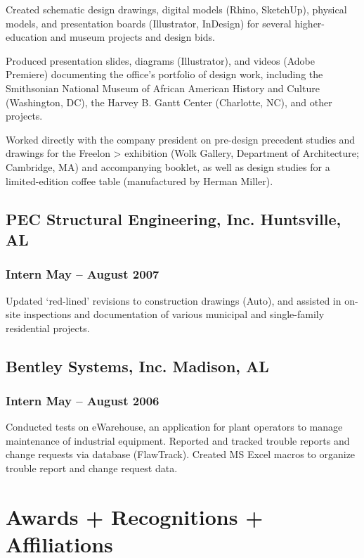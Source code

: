 \documentclass[letterpaper, oneside, 10pt]{article}
\begin{document}
Created schematic design drawings, digital models (Rhino, SketchUp), physical
models, and presentation boards (Illustrator, InDesign) for several
higher-education and museum projects and design bids.

Produced presentation slides, diagrams (Illustrator), and videos (Adobe
Premiere) documenting the office’s portfolio of design work, including the
Smithsonian National Museum of African American History and Culture
(Washington, DC), the Harvey B. Gantt Center (Charlotte, NC), and
other projects.

Worked directly with the company president on pre-design precedent studies and
drawings for the Freelon >  exhibition (Wolk Gallery, 
Department of Architecture; Cambridge, MA) and accompanying booklet, as well as
design studies for a limited-edition coffee table (manufactured by Herman
Miller).


\subsection*{PEC Structural Engineering, Inc.\DotSep{0.25em} Huntsville, AL}

\subsubsection*{Intern\DotSep{0.25em} May -- August 2007}

Updated `red-lined' revisions to construction drawings (Auto), and
assisted in on-site inspections and documentation of various municipal and
single-family residential projects.

\subsection*{Bentley Systems, Inc.\DotSep{0.25em} Madison, AL}

\subsubsection*{Intern\DotSep{0.25em} May -- August 2006}

Conducted tests on eWarehouse, an application for plant operators to manage
maintenance of industrial equipment. Reported and tracked trouble reports and
change requests via database (FlawTrack). Created MS Excel macros to organize
trouble report and change request data.


\section*{Awards + Recognitions + Affiliations} %
\end{document}

